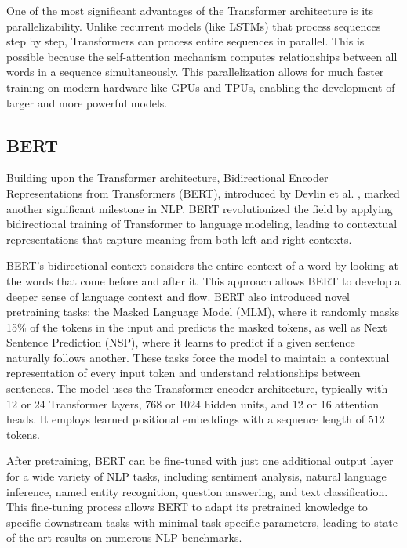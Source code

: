 \documentclass[a4paper, oneside]{discothesis}
\begin{document}
One of the most significant advantages of the Transformer architecture is its parallelizability. Unlike recurrent models (like LSTMs) that process sequences step by step, Transformers can process entire sequences in parallel. This is possible because the self-attention mechanism computes relationships between all words in a sequence simultaneously. This parallelization allows for much faster training on modern hardware like GPUs and TPUs, enabling the development of larger and more powerful models.

\subsection{BERT}
Building upon the Transformer architecture, Bidirectional Encoder Representations from Transformers (BERT), introduced by Devlin et al. \cite{devlin2018bert}, marked another significant milestone in NLP. 
BERT revolutionized the field by applying bidirectional training of Transformer to language modeling, leading to contextual representations that capture meaning from both left and right contexts.

BERT's bidirectional context considers the entire context of a word by looking at the words that come before and after it. 
This approach allows BERT to develop a deeper sense of language context and flow. 
BERT also introduced novel pretraining tasks: the Masked Language Model (MLM), where it randomly masks 15\% of the tokens in the input and predicts the masked tokens, as well as Next Sentence Prediction (NSP),
where it learns to predict if a given sentence naturally follows another. These tasks force the model to maintain a contextual representation of every input token and understand relationships between sentences.
The model uses the Transformer encoder architecture, typically with 12 or 24 Transformer layers, 768 or 1024 hidden units, and 12 or 16 attention heads. It employs learned positional embeddings with a sequence length of 512 tokens.

After pretraining, BERT can be fine-tuned with just one additional output layer for a wide variety of NLP tasks, including sentiment analysis, natural language inference, named entity recognition, question answering, and text classification. 
This fine-tuning process allows BERT to adapt its pretrained knowledge to specific downstream tasks with minimal task-specific parameters, leading to state-of-the-art results on numerous NLP benchmarks.
\end{document}
